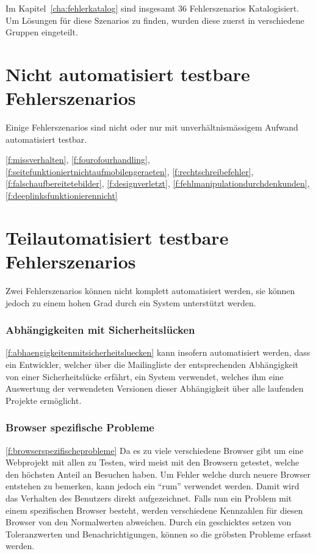 Im Kapitel~\ref{cha:fehlerkatalog} sind insgesamt 36 Fehlerszenarios Katalogisiert. Um Lösungen für diese Szenarios zu finden, wurden diese zuerst in verschiedene Gruppen eingeteilt.

\section{Nicht automatisiert testbare Fehlerszenarios}
\label{sec:nicht_automatisiert_testbare_fehlerszenarios}
Einige Fehlerszenarios sind nicht oder nur mit unverhältnismässigem Aufwand automatisiert testbar.

\ref{f:missverhalten}, \ref{f:fourofourhandling}, \ref{f:seitefunktioniertnichtaufmobilengeraeten}, \ref{f:rechtschreibefehler}, \ref{f:falschaufbereitetebilder}, \ref{f:designverletzt}, \ref{f:fehlmanipulationdurchdenkunden}, \ref{f:deeplinksfunktionierennicht}

\section{Teilautomatisiert testbare Fehlerszenarios}
\label{sec:teilautomatisiert_testbare_fehlerszenarios}
Zwei Fehlerszenarios können nicht komplett automatisiert werden, sie können jedoch zu einem hohen Grad durch ein System unterstützt werden.

\subsubsection{Abhängigkeiten mit Sicherheitslücken}
\label{ssub:kat_abhaengigkeitenmitsicherheitsluecken}
\ref{f:abhaengigkeitenmitsicherheitsluecken} kann insofern automatisiert werden, dass ein Entwickler, welcher über die Mailingliste der entsprechenden Abhängigkeit von einer Sicherheitslücke erfährt, ein System verwendet, welches ihm eine Auswertung der verwendeten Versionen dieser Abhängigkeit über alle laufenden Projekte ermöglicht.

\subsubsection{Browser spezifische Probleme}
\label{ssub:kat_browser_spezifische_probleme}
\ref{f:browserspezifischeprobleme} Da es zu viele verschiedene Browser gibt um eine Webprojekt mit allen zu Testen, wird meist mit den Browsern getestet, welche den höchsten Anteil an Besuchen haben. Um Fehler welche durch neuere Browser entstehen zu bemerken, kann jedoch ein ``\acrlong{rum}''  verwendet werden. Damit wird das Verhalten des Benutzers direkt aufgezeichnet. Falls nun ein Problem mit einem spezifischen Browser besteht, werden verschiedene Kennzahlen für diesen Browser von den Normalwerten abweichen. Durch ein geschicktes setzen von Toleranzwerten und Benachrichtigungen, können so die gröbsten Probleme erfasst werden.

